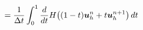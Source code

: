 \documentclass[preview]{standalone}
\newcommand{\bu}{\boldsymbol{u}_h}
\begin{document}
\begin{align*}
\special{dvisvgm:raw <g id='unique000'>}=\frac{1}{\Delta t}\int_0^1\frac{d}{dt}H\big((1-t)\bu^n+t\bu^{n+1}\big)\,dt\special{dvisvgm:raw </g>}
\end{align*}
\end{document}
